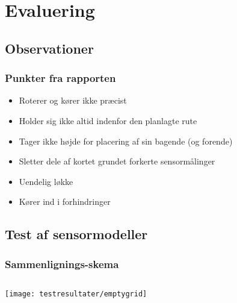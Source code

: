 \section{Evaluering}

\subsection{Observationer}

\begin{frame}
\frametitle{Punkter fra rapporten}
\begin{itemize}
\item Roterer og kører ikke præcist
\item Holder sig ikke altid indenfor den planlagte rute
\item Tager ikke højde for placering af sin bagende (og forende)
\item Sletter dele af kortet grundet forkerte sensormålinger
\item Uendelig løkke
\item Kører ind i forhindringer
\end{itemize}
\end{frame}

\subsection{Test af sensormodeller}
\begin{frame}
\frametitle{Sammenlignings-skema}
\begin{columns}
\begin{column}{.59\textwidth}
\begin{center}
\texttt{[image: testresultater/emptygrid]}\\

\end{center}
\end{column}
\begin{column}{.40\textwidth}
\\
\end{column}
\end{columns}
\end{frame}